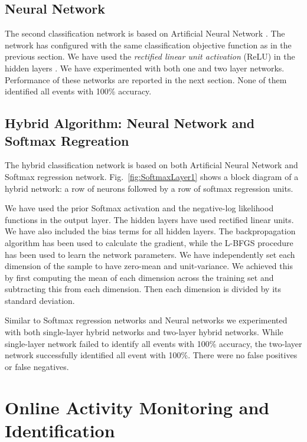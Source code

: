 \documentclass{IEEEtran}
\begin{document}
\subsection{Neural Network}
\label{sec:NeuralNetwork1}
The second classification network is based on Artificial Neural Network \cite{Bishop06a}. 
The network has configured with the same classification objective function as in the 
previous section. We have 
used the \emph{rectified linear unit  activation} (ReLU) in the hidden layers 
\cite{AISTATS2011_GlorotBB11}. We have experimented with both one and two layer networks. 
Performance of these networks are reported in the next section. None of them identified 
all events with 100\% accuracy.

\subsection{Hybrid Algorithm: Neural Network and Softmax Regreation}
\label{sec:HybridAlgorithmNeuralNetworkAndSoftmaxRegreation}

The hybrid classification network is based on both Artificial Neural Network  and Softmax regression network. Fig.~\ref{fig:SoftmaxLayer1} shows a block diagram of a hybrid network: a row of neurons followed by a row of softmax regression units.
\par
We have used the prior Softmax activation  and the negative-log likelihood 
functions in the output layer. The hidden layers have used rectified linear units. 
We have also included the bias terms for all hidden layers. The backpropagation algorithm\cite{Sarkar1995}
has been used to calculate the gradient, while the L-BFGS procedure has been used to 
learn the network parameters. We have independently set each dimension of the sample to 
have zero-mean and unit-variance. We achieved this by first computing the mean of each 
dimension across the training set and subtracting this from each dimension. Then each 
dimension is divided by its standard deviation.       

Similar to Softmax regression networks and Neural networks we experimented  with both single-layer hybrid networks and two-layer hybrid networks. While single-layer network failed to identify all events with 100\% accuracy, the two-layer network successfully identified all event with 100\%. There were no false positives or false negatives.

\section{Online Activity Monitoring and Identification}
\end{document}
